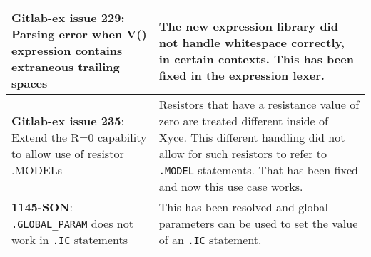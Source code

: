 {\begin{longtable}[h] {>{\raggedright\small}m{2in}|>{\raggedright\let\\\tabularnewline\small}m{3.5in}}
  \textbf{Gitlab-ex issue 229}: Parsing error when V() expression contains extraneous trailing spaces &
The new expression library did not handle whitespace correctly, in certain contexts.  
  This has been fixed in the expression lexer.
  \\ \hline

  \textbf{Gitlab-ex issue 235}: Extend the R=0 capability to allow use of resistor .MODELs & 
Resistors that have a resistance value of zero are treated different inside of Xyce.  
  This different handling did not allow for such resistors to refer to \texttt{.MODEL} statements.  
  That has been fixed and now this use case works.
  \\ \hline

  \textbf{1145-SON}: \texttt{.GLOBAL\_PARAM} does not work in \texttt{.IC} statements &  
      This has been resolved and global parameters can be used to set the 
      value of an \texttt{.IC} statement.\\ \hline
\end{longtable}
}
